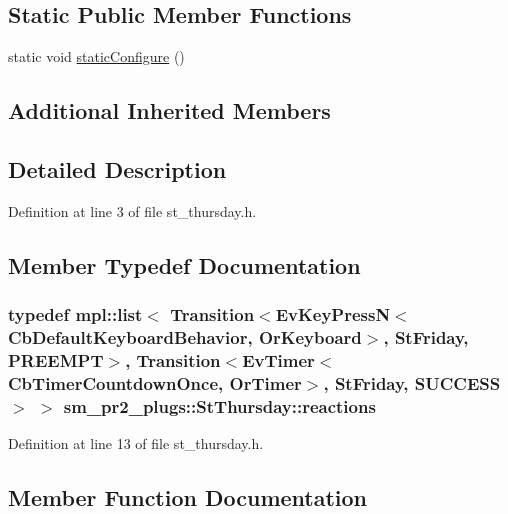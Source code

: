 \subsection*{Static Public Member Functions}
\begin{DoxyCompactItemize}
\item 
static void \hyperlink{structsm__pr2__plugs_1_1StThursday_a33ef6821464476f8248d6805e534221c}{static\+Configure} ()
\end{DoxyCompactItemize}
\subsection*{Additional Inherited Members}


\subsection{Detailed Description}


Definition at line 3 of file st\+\_\+thursday.\+h.



\subsection{Member Typedef Documentation}
\subsubsection[{\texorpdfstring{reactions}{reactions}}]{\setlength{\rightskip}{0pt plus 5cm}typedef mpl\+::list$<$ Transition$<$Ev\+Key\+PressN$<$Cb\+Default\+Keyboard\+Behavior, {\bf Or\+Keyboard}$>$, {\bf St\+Friday}, {\bf P\+R\+E\+E\+M\+PT}$>$, Transition$<$Ev\+Timer$<$Cb\+Timer\+Countdown\+Once, {\bf Or\+Timer}$>$, {\bf St\+Friday}, {\bf S\+U\+C\+C\+E\+SS}$>$ $>$ {\bf sm\+\_\+pr2\+\_\+plugs\+::\+St\+Thursday\+::reactions}}\hypertarget{structsm__pr2__plugs_1_1StThursday_a403fb205b005edf2aa474205db1da9b8}{}\label{structsm__pr2__plugs_1_1StThursday_a403fb205b005edf2aa474205db1da9b8}


Definition at line 13 of file st\+\_\+thursday.\+h.



\subsection{Member Function Documentation}
